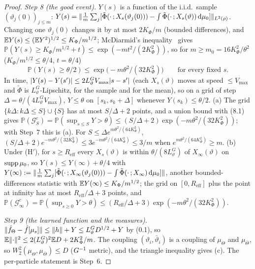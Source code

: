 \begin{proof}
\smallskip
\emph{Step 8 (the good event).} $Y(s)$ is a function of the i.i.d.\ sample $(\vartheta_j(0))_{j\le m}$:
$Y(s) = \lVert \frac1m\sum_j[\tilde\Phi(\cdot\,;X_s(\vartheta_j(0))) - \int\tilde\Phi(\cdot\,;X_s(\vartheta))\,\mathrm{d}\mu_0]\rVert_{L^2(\rho)}$.
Changing one $\vartheta_j(0)$ changes it by at most $2K_\Phi/m$ (bounded differences), and
$\mathbb{E} Y(s)\le(\mathbb{E} Y^2)^{1/2}\le K_\Phi/m^{1/2}$; McDiarmid's inequality~\cite{S36} gives
$\mathbb{P}(Y(s)\ge K_\Phi/m^{1/2} + t)\le\exp(-mt^2/(2K_\Phi^2))$, so for $m\ge m_0 = 16K_\Phi^2/\theta^2$
($K_\Phi/m^{1/2}\le\theta/4$, $t = \theta/4$)
\begin{equation}
  \mathbb{P}(Y(s)\ge\theta/2)\le\exp\bigl(-m\theta^2/(32K_\Phi^2)\bigr)\qquad\text{for every fixed }s.
  \tag{8.1}
\end{equation}
In time, $\lvert Y(s) - Y(s')\rvert\le2L_\vartheta^GV_{\max}\lvert s - s'\rvert$ (each $X_s(\vartheta)$ moves at speed
$\le V_{\max}$ and $\tilde\Phi$ is $L_\vartheta^G$-Lipschitz, for the sample and for the mean), so on a grid of step
$\Delta = \theta/(4L_\vartheta^GV_{\max})$, $Y\le\theta$ on $[s_k,s_k + \Delta]$ whenever $Y(s_k)\le\theta/2$. (a) The
grid $\{k\Delta : k\Delta\le S\}\cup\{S\}$ has at most $S/\Delta + 2$ points, and a union bound with (8.1) gives
$\mathbb{P}(\mathcal{G}_S^c) = \mathbb{P}(\sup_{s\le S}Y > \theta)\le(S/\Delta + 2)\exp(-m\theta^2/(32K_\Phi^2))$;
with Step~7 this is (a). For $S\le\Delta e^{m\theta^2/(64K_\Phi^2)}$,
$(S/\Delta + 2)e^{-m\theta^2/(32K_\Phi^2)}\le3e^{-m\theta^2/(64K_\Phi^2)}\le3/m$ when
$e^{m\theta^2/(64K_\Phi^2)}\ge m$. (b) Under (H$'$), for $s\ge R_{\mathrm{eff}}$ every $X_s(\vartheta)$ is within
$\theta/(8L_\vartheta^G)$ of $X_\infty(\vartheta)$ on $\operatorname{supp}\mu_0$, so $Y(s)\le Y(\infty) + \theta/4$ with
$Y(\infty) := \lVert \frac1m\sum_j[\tilde\Phi(\cdot\,;X_\infty(\vartheta_j(0))) - \int\tilde\Phi(\cdot\,;X_\infty)\,\mathrm{d}\mu_0]\rVert$,
another bounded-differences statistic with $\mathbb{E} Y(\infty)\le K_\Phi/m^{1/2}$; the grid on $[0,R_{\mathrm{eff}}]$ plus
the point at infinity has at most $R_{\mathrm{eff}}/\Delta + 3$ points, and
$\mathbb{P}(\mathcal{G}_\infty^c) = \mathbb{P}(\sup_{s\ge0}Y > \theta)\le(R_{\mathrm{eff}}/\Delta + 3)\exp(-m\theta^2/(32K_\Phi^2))$.

\smallskip
\emph{Step 9 (the learned function and the measures).}
$\lVert \hat f_\Theta - \hat f[\mu_s]\rVert\le\lVert h\rVert + Y\le L_\vartheta^GD^{1/2} + Y$ by (0.1), so
$\mathbb{E}\lVert \cdot\rVert^2\le2(L_\vartheta^G)^2\mathbb{E} D + 2K_\Phi^2/m$. The coupling $(\vartheta_i,\bar\vartheta_i)$ is a coupling
of $\mu_\Theta$ and $\mu_{\bar\Theta}$, so $W_2^2(\mu_\Theta,\mu_{\bar\Theta})\le D$ ($G^{-1}$ metric), and the
triangle inequality gives (c). The per-particle statement is Step~6.
\end{proof}


